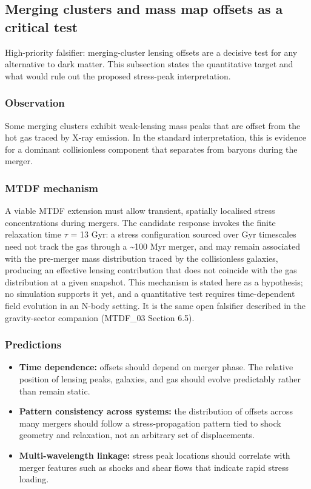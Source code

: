 \documentclass[11pt,a4paper]{article}
\begin{document}
\subsection{Merging clusters and mass map offsets as a critical test}
\begin{mdframed}[linecolor=accent,linewidth=0.5pt,backgroundcolor=callout-bg,leftline=true,rightline=true,topline=true,bottomline=true,innerleftmargin=8pt,innerrightmargin=8pt,innertopmargin=6pt,innerbottommargin=6pt]
High-priority falsifier: merging-cluster lensing offsets are a decisive test for any alternative to dark matter. This subsection states the quantitative target and what would rule out the proposed stress-peak interpretation.
\end{mdframed}

\subsubsection{Observation}
Some merging clusters exhibit weak-lensing mass peaks that are offset from the hot gas traced by X-ray emission. In the standard interpretation, this is evidence for
a dominant collisionless component that separates from baryons during the merger.

\subsubsection{MTDF mechanism}
A viable MTDF extension must allow transient, spatially localised stress concentrations during mergers. The candidate response invokes the finite relaxation time $\tau$ = 13 Gyr: a stress configuration sourced over Gyr timescales need not track the gas through a \~{}100 Myr merger, and may remain associated with the pre-merger mass distribution traced by the collisionless galaxies, producing an effective lensing contribution that does not coincide with the gas distribution at a given snapshot. This mechanism is stated here as a hypothesis; no simulation supports it yet, and a quantitative test requires time-dependent field evolution in an N-body setting. It is the same open falsifier described in the gravity-sector companion (MTDF\_\allowbreak{}03 Section 6.5).

\subsubsection{Predictions}
\begin{itemize}
  \item \textbf{Time dependence:} offsets should depend on merger phase. The relative position of lensing peaks, galaxies, and gas should evolve predictably rather than remain static.
  \item \textbf{Pattern consistency across systems:} the distribution of offsets across many mergers should follow a stress-propagation pattern tied to shock geometry and relaxation, not an arbitrary set of displacements.
  \item \textbf{Multi-wavelength linkage:} stress peak locations should correlate with merger features such as shocks and shear flows that indicate rapid stress loading.
\end{itemize}
\end{document}

